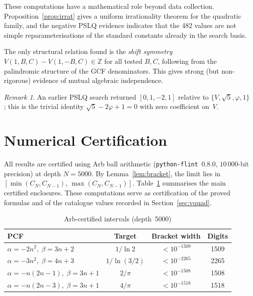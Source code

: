 \documentclass[11pt,a4paper]{article}
\theoremstyle{plain}
\theoremstyle{definition}
\theoremstyle{remark}
\newtheorem{remark}[theorem]{Remark}
\begin{document}
These computations have a mathematical role beyond data collection.
Proposition~\ref{prop:irrat} gives a uniform irrationality theorem for the
quadratic family, and the negative PSLQ evidence indicates that the 482 values
are not simple reparameterisations of the standard constants already in the
search basis.

The only structural relation found is the \emph{shift symmetry}
$V(1,B,C) - V(1,-B,C) \in \mathbb{Z}$ for all tested $B, C$,
following from the palindromic structure of the GCF denominators.
This gives strong (but non-rigorous) evidence of mutual algebraic
independence.

\begin{remark}
An earlier PSLQ search returned $[0, 1, -2, 1]$ relative to
$\{V, \sqrt{5}, \varphi, 1\}$; this is the trivial identity
$\sqrt{5} - 2\varphi + 1 = 0$ with zero coefficient on~$V$.
\end{remark}

\appendix
\section{Numerical Certification}\label{sec:cert}

All results are certified using Arb ball arithmetic
(\texttt{python-flint}~0.8.0, $10\,000$-bit precision)
at depth $N = 5000$.
By Lemma~\ref{lem:bracket}, the limit lies in
$[\min(C_N, C_{N-1}),\, \max(C_N, C_{N-1})]$.
Table~\ref{tab:cert} summarises the main certified enclosures.
These computations serve as certification of the proved formulas and of the
catalogue values recorded in Section~\ref{sec:vquad}.

\begin{table}[ht]
\centering
\caption{Arb-certified intervals (depth~5000)}\label{tab:cert}
\begin{tabular}{@{}lccc@{}}
\toprule
PCF & Target & Bracket width & Digits \\
\midrule
$\alpha{=}{-}2n^2,\;\beta{=}3n{+}2$
  & $1/\ln 2$    & $<10^{-1509}$ & 1509 \\
$\alpha{=}{-}3n^2,\;\beta{=}4n{+}3$
  & $1/\ln(3/2)$ & $<10^{-2265}$ & 2265 \\
$\alpha{=}{-}n(2n{-}1),\;\beta{=}3n{+}1$
  & $2/\pi$      & $<10^{-1508}$ & 1508 \\
$\alpha{=}{-}n(2n{-}3),\;\beta{=}3n{+}1$
  & $4/\pi$      & $<10^{-1518}$ & 1518 \\
\bottomrule
\end{tabular}
\end{table}
\end{document}
